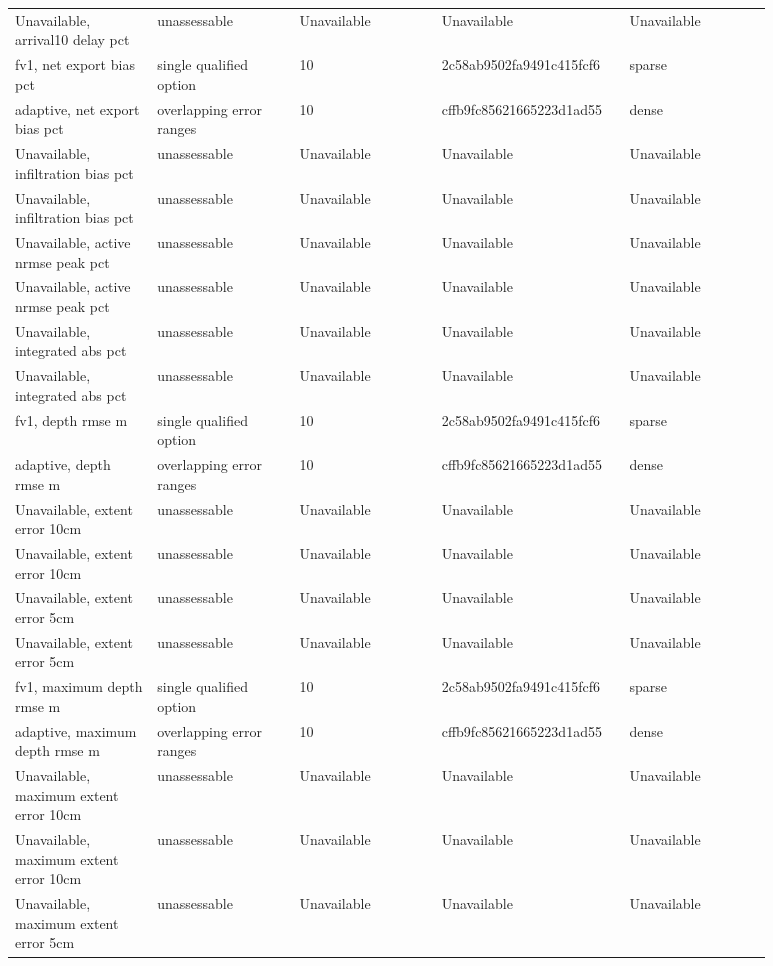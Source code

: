 \begin{longtable}{p{0.1760\linewidth}p{0.1760\linewidth}p{0.1760\linewidth}p{0.1760\linewidth}p{0.1760\linewidth}}
Unavailable, arrival10 delay pct & unassessable & Unavailable & Unavailable & Unavailable \\
fv1, net export bias pct & single qualified option & 10 & 2c58ab9502fa9491c415fcf6 & sparse \\
adaptive, net export bias pct & overlapping error ranges & 10 & cffb9fc85621665223d1ad55 & dense \\
Unavailable, infiltration bias pct & unassessable & Unavailable & Unavailable & Unavailable \\
Unavailable, infiltration bias pct & unassessable & Unavailable & Unavailable & Unavailable \\
Unavailable, active nrmse peak pct & unassessable & Unavailable & Unavailable & Unavailable \\
Unavailable, active nrmse peak pct & unassessable & Unavailable & Unavailable & Unavailable \\
Unavailable, integrated abs pct & unassessable & Unavailable & Unavailable & Unavailable \\
Unavailable, integrated abs pct & unassessable & Unavailable & Unavailable & Unavailable \\
fv1, depth rmse m & single qualified option & 10 & 2c58ab9502fa9491c415fcf6 & sparse \\
adaptive, depth rmse m & overlapping error ranges & 10 & cffb9fc85621665223d1ad55 & dense \\
Unavailable, extent error 10cm & unassessable & Unavailable & Unavailable & Unavailable \\
Unavailable, extent error 10cm & unassessable & Unavailable & Unavailable & Unavailable \\
Unavailable, extent error 5cm & unassessable & Unavailable & Unavailable & Unavailable \\
Unavailable, extent error 5cm & unassessable & Unavailable & Unavailable & Unavailable \\
fv1, maximum depth rmse m & single qualified option & 10 & 2c58ab9502fa9491c415fcf6 & sparse \\
adaptive, maximum depth rmse m & overlapping error ranges & 10 & cffb9fc85621665223d1ad55 & dense \\
Unavailable, maximum extent error 10cm & unassessable & Unavailable & Unavailable & Unavailable \\
Unavailable, maximum extent error 10cm & unassessable & Unavailable & Unavailable & Unavailable \\
Unavailable, maximum extent error 5cm & unassessable & Unavailable & Unavailable & Unavailable \\

\end{longtable}
